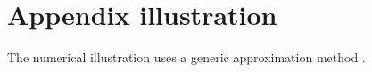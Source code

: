 \section{Appendix illustration}
The numerical illustration uses a generic approximation method
\parencite{synthetic-method}.
